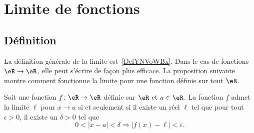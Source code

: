 
\section{Limite de fonctions}

\subsection{Définition}

La définition générale de la limite est~\ref{DefYNVoWBx}. Dans le cas de fonctions \( \eR\to \eR\), elle peut s'écrire de façon plus efficace. La proposition suivante montre comment fonctionne la limite pour une fonction définie sur tout \( \eR\).

\begin{proposition}       \label{PropAJQQooQQClfp}
	Soit une fonction $f\colon \eR\to \eR$ définie sur \( \eR\) et $a\in \eR$. La fonction \( f\) admet la limite \( \ell\) pour \( x\to a\) si et seulement si il existe un réel $\ell$ tel que pour tout \( \epsilon>0\), il existe un \( \delta>0\) tel que
	\begin{equation}\label{EqDefLimiteFonction}
		0<| x-a |<\delta\Rightarrow| f(x)-\ell |<\varepsilon.
	\end{equation}
\end{proposition}

